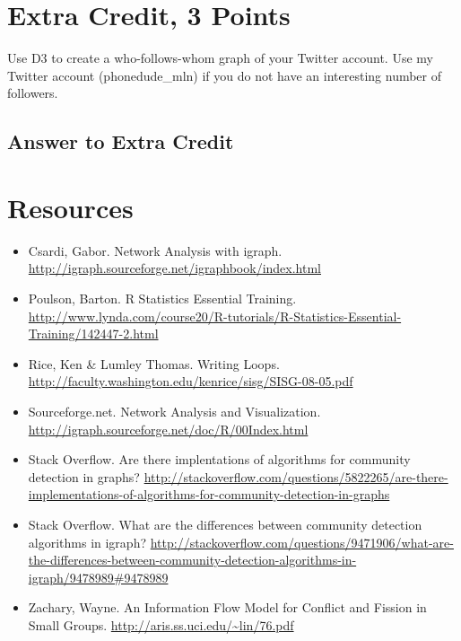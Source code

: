 \documentclass{article}
\begin{document}
\newpage

\section*{Extra Credit, 3 Points}

Use D3 to create a who-follows-whom graph of your Twitter account. Use my Twitter account (phonedude\_mln) if you do not have an interesting number of followers.


\subsection*{Answer to Extra Credit}





\newpage

\section*{Resources}

\begin{itemize}
\item Csardi, Gabor. Network Analysis with igraph. \url{http://igraph.sourceforge.net/igraphbook/index.html}
\item Poulson, Barton. R Statistics Essential Training. \url{http://www.lynda.com/course20/R-tutorials/R-Statistics-Essential-Training/142447-2.html}
\item Rice, Ken \& Lumley Thomas. Writing Loops. \url{http://faculty.washington.edu/kenrice/sisg/SISG-08-05.pdf}
\item Sourceforge.net. Network Analysis and Visualization. \url{http://igraph.sourceforge.net/doc/R/00Index.html}
\item Stack Overflow. Are there implentations of algorithms for community detection in graphs? \url{http://stackoverflow.com/questions/5822265/are-there-implementations-of-algorithms-for-community-detection-in-graphs}
\item Stack Overflow. What are the differences between community detection algorithms in igraph? \url{http://stackoverflow.com/questions/9471906/what-are-the-differences-between-community-detection-algorithms-in-igraph/9478989#9478989}
\item Zachary, Wayne. An Information Flow Model for Conflict and Fission in Small Groups. \url{http://aris.ss.uci.edu/~lin/76.pdf}


\end{itemize}
\end{document}
